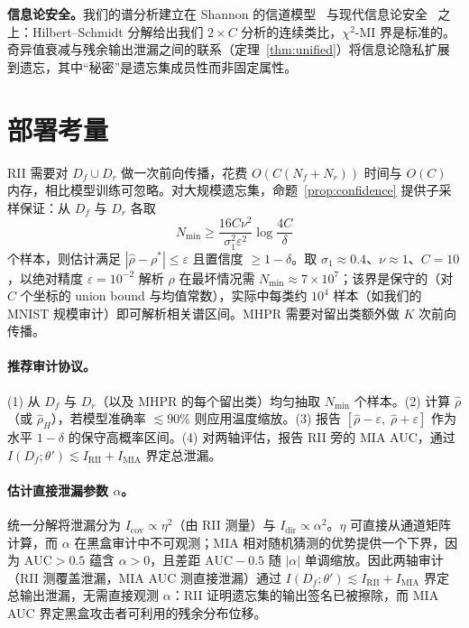 \textbf{信息论安全。}我们的谱分析建立在 Shannon 的信道模型~\cite{shannon1949communication} 与现代信息论安全~\cite{bloch2021overview} 之上：Hilbert--Schmidt 分解给出我们 $2\times C$ 分析的连续类比，$\chi^2$-MI 界是标准的。奇异值衰减与残余输出泄漏之间的联系（定理~\ref{thm:unified}）将信息论隐私扩展到遗忘，其中``秘密''是遗忘集成员性而非固定属性。

\section{部署考量}
\label{sec:deployment}

RII 需要对 $D_f \cup D_r$ 做一次前向传播，花费 $O(C(N_f+N_r))$ 时间与 $O(C)$ 内存，相比模型训练可忽略。对大规模遗忘集，命题~\ref{prop:confidence} 提供子采样保证：从 $D_f$ 与 $D_r$ 各取
\[
N_{\min} \ge \frac{16C\nu^2}{\sigma_1^2\varepsilon^2}\log\frac{4C}{\delta}
\]
个样本，则估计满足 $|\hat{\rho}-\rho^*| \le \varepsilon$ 且置信度 $\ge 1-\delta$。取 $\sigma_1\approx0.4$、$\nu\approx1$、$C=10$，以绝对精度 $\varepsilon=10^{-2}$ 解析 $\rho$ 在最坏情况需 $N_{\min}\approx7\times10^7$；该界是保守的（对 $C$ 个坐标的 union bound 与均值常数），实际中每类约 $10^4$ 样本（如我们的 MNIST 规模审计）即可解析相关谱区间。MHPR 需要对留出类额外做 $K$ 次前向传播。

\paragraph{推荐审计协议。}
(1) 从 $D_f$ 与 $D_r$（以及 MHPR 的每个留出类）均匀抽取 $N_{\min}$ 个样本。(2) 计算 $\hat{\rho}$（或 $\hat{\rho}_H$），若模型准确率 $\lesssim 90\%$ 则应用温度缩放。(3) 报告 $[\hat{\rho}-\varepsilon,\;\hat{\rho}+\varepsilon]$ 作为水平 $1-\delta$ 的保守高概率区间。(4) 对两轴评估，报告 RII 旁的 MIA AUC，通过 $I(D_f;\theta') \lesssim I_{\mathrm{RII}} + I_{\mathrm{MIA}}$ 界定总泄漏。

\paragraph{估计直接泄漏参数 $\alpha$。}
统一分解将泄漏分为 $I_{\mathrm{cov}}\propto\eta^2$（由 RII 测量）与 $I_{\mathrm{dir}}\propto\alpha^2$。$\eta$ 可直接从通道矩阵计算，而 $\alpha$ 在黑盒审计中不可观测；MIA 相对随机猜测的优势提供一个下界，因为 $\mathrm{AUC}>0.5$ 蕴含 $\alpha>0$，且差距 $\mathrm{AUC}-0.5$ 随 $|\alpha|$ 单调缩放。因此两轴审计（RII 测覆盖泄漏，MIA AUC 测直接泄漏）通过 $I(D_f;\theta') \lesssim I_{\mathrm{RII}} + I_{\mathrm{MIA}}$ 界定总输出泄漏，无需直接观测 $\alpha$：RII 证明遗忘集的输出签名已被擦除，而 MIA AUC 界定黑盒攻击者可利用的残余分布位移。

